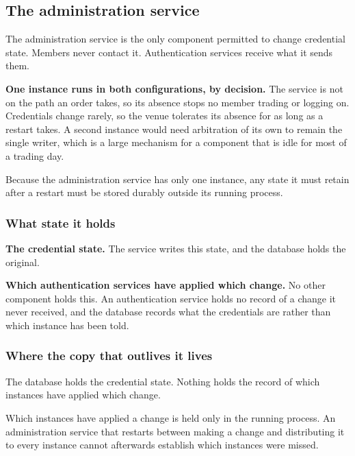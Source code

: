 \subsection{The administration service}
\label{sec:ha:disabled:admin}

The administration service is the only component permitted to change credential
state. Members never contact it. Authentication services receive what it sends
them.

\textbf{One instance runs in both configurations, by decision.} The service is
not on the path an order takes, so its absence stops no member trading or logging
on. Credentials change rarely, so the venue tolerates its absence for as long as
a restart takes. A second instance would need arbitration of its own to remain
the single writer, which is a large mechanism for a component that is idle for
most of a trading day.

Because the administration service has only one instance, any state it must
retain after a restart must be stored durably outside its running process.

\subsubsection{What state it holds}
\label{sec:ha:disabled:admin:state}

\textbf{The credential state.} The service writes this state, and the database
holds the original.

\textbf{Which authentication services have applied which change.} No other
component holds this. An authentication service holds no record of a change it
never received, and the database records what the credentials are rather than
which instance has been told.

\subsubsection{Where the copy that outlives it lives}
\label{sec:ha:disabled:admin:durable}

The database holds the credential state. Nothing holds the record of which
instances have applied which change.

\begin{gap}{}
  Which instances have applied a change is held only in the running process. An
  administration service that restarts between making a change and distributing
  it to every instance cannot afterwards establish which instances were missed.
\end{gap}

